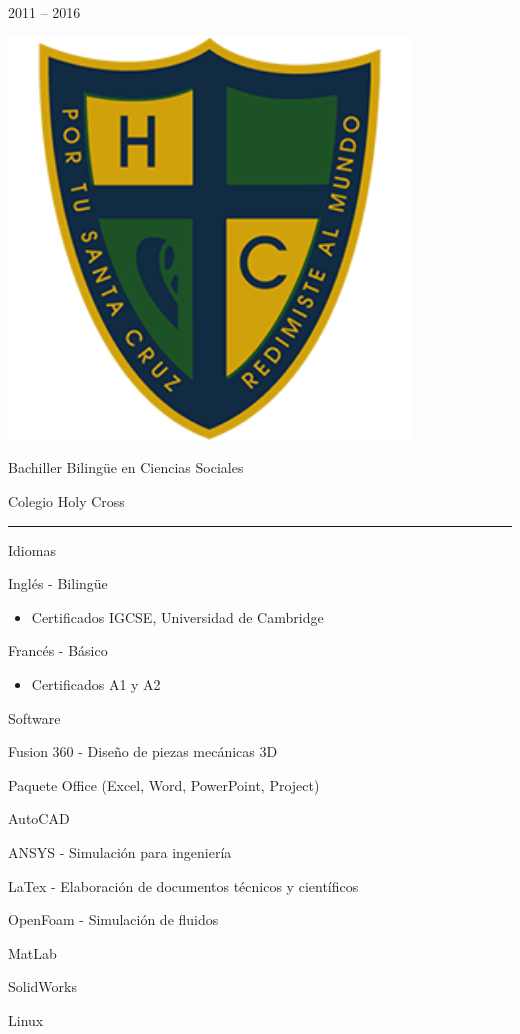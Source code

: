 \documentclass[a4paper,10pt]{article}
\newlength{\cvcolumngapwidth}
\newlength{\cvleftcolumnwidth}
\newlength{\cvrightcolumnwidth}
\newcommand{\cvsectionstyle}[1]{{\normalsize\cvsectionfont\textcolor{cvsectioncolor}{#1}}}
\newcommand{\cvtitlestyle}[1]{{\large\cvtitlefont\textcolor{cvtitlecolor}{#1}}}
\newcommand{\cvdurationstyle}[1]{{\small\cvdurationfont\textcolor{cvdurationcolor}{#1}}}
\newcommand{\cvheadingstyle}[1]{{\normalsize\cvheadingfont\textcolor{cvheadingcolor}{#1}}}
\newlength{\cvafteritemskipamount}
\newlength{\cvaftersectionskipamount}
\newlength{\cvbetweensectionandheadingextraskipamount}
\newlength{\cvaftertitleskipamount}
\newlength{\cvparskip}
\newcommand{\cvsection}[1]{
    \begin{minipage}[t]{\cvleftcolumnwidth}
        \raggedleft\cvsectionstyle{#1}
    \end{minipage}%
    \hspace{\cvcolumngapwidth}%
    \begin{minipage}[t]{\cvrightcolumnwidth}
        \textcolor{cvrulecolor}{\rule{\cvrightcolumnwidth}{0.3mm}}
    \end{minipage}

    \vspace{\cvaftersectionskipamount}
}
\newcommand{\cvitem}[2]{
    \begin{minipage}[t]{\cvleftcolumnwidth}
        \raggedleft #1
    \end{minipage}%
    \hspace{\cvcolumngapwidth}%
    \begin{minipage}[t]{\cvrightcolumnwidth}
        \setlength{\parskip}{\cvparskip} #2
    \end{minipage}

    \vspace{\cvafteritemskipamount}
}
\newcommand{\cvtitle}[1]{
    \cvtitlestyle{#1}

    \vspace{\cvaftertitleskipamount}
    \vspace{-\cvparskip}
}
\begin{document}
\cvitem{
    \cvdurationstyle{2011 -- 2016}
}{
    \begin{minipage}{0.1\textwidth}
        \centering
        \includegraphics[width=0.8\textwidth]{Logo_HC.png}   
    \end{minipage}  
    \cvtitle{Bachiller Bilingüe en Ciencias Sociales}

    Colegio Holy Cross
}


\newpage
\cvsection{HABILIDADES}

\vspace{\cvbetweensectionandheadingextraskipamount}

\cvitem{
    \cvheadingstyle{Idiomas}
}{
    Inglés - Bilingüe
    \begin{itemize}
        \item Certificados IGCSE, Universidad de Cambridge
    \end{itemize}

    Francés - Básico
    \begin{itemize}
        \item Certificados A1 y A2
    \end{itemize}
}

\cvitem{
    \cvheadingstyle{Software}
}{
    Fusion 360 - Diseño de piezas mecánicas 3D
    
    Paquete Office (Excel, Word, PowerPoint, Project)

    AutoCAD
    
    ANSYS - Simulación para ingeniería
    
    LaTex - Elaboración de documentos técnicos y científicos
    
    OpenFoam - Simulación de fluidos

    MatLab

    SolidWorks

    Linux
}
\end{document}
